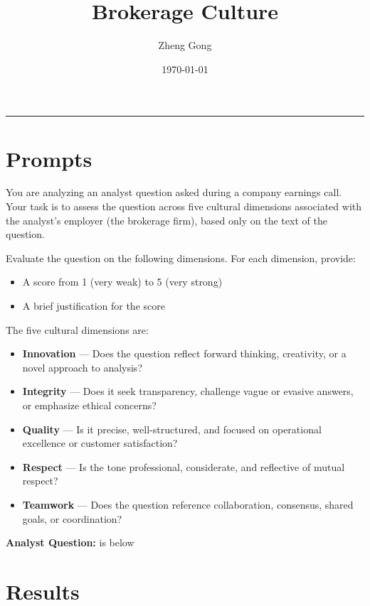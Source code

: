 \documentclass[10pt]{article}
\title{Brokerage Culture}
\author{Zheng Gong}
\date{\today}
\begin{document}
\maketitle
\thispagestyle{empty}
\begin{center}
    \rule{0.8\textwidth}{0.4pt}
\end{center}
\vspace{1em}


\section{Prompts}
You are analyzing an analyst question asked during a company earnings call. Your task is to assess the question across five cultural dimensions associated with the analyst’s employer (the brokerage firm), based only on the text of the question.

Evaluate the question on the following dimensions. For each dimension, provide:
\begin{itemize}
\item A score from 1 (very weak) to 5 (very strong)
\item A brief justification for the score
\end{itemize}

The five cultural dimensions are:

\begin{itemize}
\item \textbf{Innovation} — Does the question reflect forward thinking, creativity, or a novel approach to analysis?
\item \textbf{Integrity} — Does it seek transparency, challenge vague or evasive answers, or emphasize ethical concerns?
\item \textbf{Quality} — Is it precise, well-structured, and focused on operational excellence or customer satisfaction?
\item \textbf{Respect} — Is the tone professional, considerate, and reflective of mutual respect?
\item \textbf{Teamwork} — Does the question reference collaboration, consensus, shared goals, or coordination?
\end{itemize}

\textbf{Analyst Question:} is below


\section{Results}

    



\end{document}
